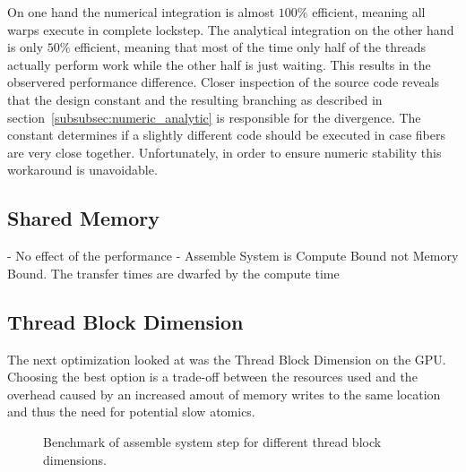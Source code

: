 \documentclass[a4paper,11pt]{kth-mag}
\begin{document}
On one hand the numerical integration is almost $100\%$ efficient, meaning all warps execute in complete lockstep. The analytical integration on the other hand is only $50\%$ efficient, meaning that most of the time only half of the threads actually perform work while the other half is just waiting. This results in the observered performance difference. Closer inspection of the source code reveals that the design constant and the resulting branching as described in section~\ref{subsubsec:numeric_analytic} is responsible for the divergence. The constant determines if a slightly different code should be executed in case fibers are very close together. Unfortunately, in order to ensure numeric stability this workaround is unavoidable.

\subsection{Shared Memory}

- No effect of the performance
- Assemble System is Compute Bound not Memory Bound. The transfer times are dwarfed by the compute time

\subsection{Thread Block Dimension}

The next optimization looked at was the Thread Block Dimension on the GPU. Choosing the best option is a trade-off between the resources used and the overhead caused by an increased amout of memory writes to the same location and thus the need for potential slow atomics.

\begin{figure}
  \centering
  \caption{Benchmark of assemble system step for different thread block dimensions.}
  \label{fig:bench_cuda_thread_blocks}
\end{figure}
\end{document}
